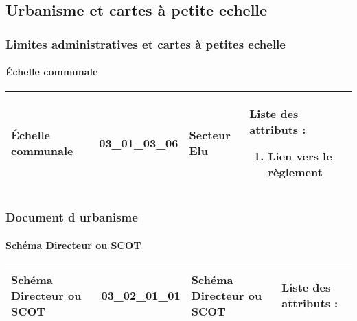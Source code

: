 \documentclass[12pt,titlepage,oneside]{book}
\begin{document}
\subsection{Urbanisme et cartes à petite echelle}
\subsubsection{\large Limites administratives et cartes à petites echelle}
\paragraph{Échelle communale}
\noindent
\vspace{\baselineskip}

\renewcommand{\arraystretch}{1.2}
\begin{supertabular}{|p{10cm}|c|p{13cm}|p{12cm}|}
 Échelle communale & 03\_01\_03\_06 & Secteur Elu & Liste des attributs :
\begin{enumerate}
  \item Lien vers le règlement\end{enumerate}
\\
\hline
\end{supertabular}
\begin{figure}[h!]
  \hfill         %
\end{figure}

\subsubsection{\large Document d urbanisme}
\paragraph{Schéma Directeur ou SCOT}
\noindent
\vspace{\baselineskip}

\renewcommand{\arraystretch}{1.2}
\begin{supertabular}{|p{10cm}|c|p{13cm}|p{12cm}|}
 Schéma Directeur ou SCOT & 03\_02\_01\_01 & Schéma Directeur ou SCOT & Liste des attributs :
\begin{enumerate}
\end{enumerate}
\\
\hline
\end{supertabular}
\begin{figure}[h!]
  \hfill         %
\end{figure}
\end{document}
